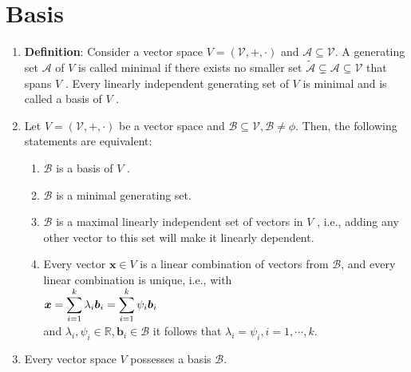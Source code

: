 \section{Basis}

\begin{enumerate}
    \item \textbf{Definition}: Consider a vector space $V = (\mathcal{V}, +, \cdot)$ and $\mathcal{A} \subseteq  \mathcal{V}$. 
    A generating set $\mathcal{A}$ of $V$ is called minimal if there exists no smaller set $\tilde{\mathcal{A}} \subsetneq \mathcal{A} \subseteq \mathcal{V}$ that spans $V$ . 
    Every linearly independent generating set of $V$ is minimal and is called a basis of $V$ .
    \hfill \cite{mfml/book/mml/Deisenroth-Faisal-Ong}

    \item Let $V = (\mathcal{V}, +, \cdot)$ be a vector space and $\mathcal{B} \subseteq \mathcal{V}, \mathcal{B} \neq \phi$. Then, the following statements are equivalent:
    \hfill \cite{mfml/book/mml/Deisenroth-Faisal-Ong}
    \begin{enumerate}
        \item $\mathcal{B}$ is a basis of $V$ .
        \hfill \cite{mfml/book/mml/Deisenroth-Faisal-Ong}

        \item $\mathcal{B}$ is a minimal generating set.
        \hfill \cite{mfml/book/mml/Deisenroth-Faisal-Ong}

        \item $\mathcal{B}$ is a maximal linearly independent set of vectors in $V$ , i.e., adding any other vector to this set will make it linearly dependent.
        \hfill \cite{mfml/book/mml/Deisenroth-Faisal-Ong}

        \item Every vector $\bm{x} \in V$ is a linear combination of vectors from $\mathcal{B}$, and every linear combination is unique, i.e., with
        \\
        $
            \bm{x} 
            = \displaystyle\sum_{i=1}^k \lambda_i \bm{b}_i
            = \displaystyle\sum_{i=1}^k \psi_i \bm{b}_i
        $
        \\
        and $\lambda_i , \psi_i \in \mathbb{R}, \bm{b}_i \in \mathcal{B}$ it follows that $\lambda_i = \psi_i , i = 1, \cdots , k$.
        \hfill \cite{mfml/book/mml/Deisenroth-Faisal-Ong}
    \end{enumerate}

    \item Every vector space $V$ possesses a basis $\mathcal{B}$.
    \hfill \cite{mfml/book/mml/Deisenroth-Faisal-Ong}


\end{enumerate}

